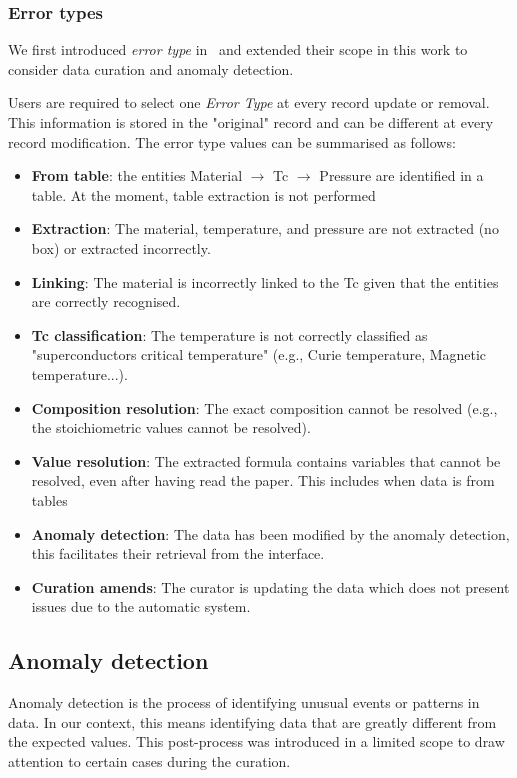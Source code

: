 \documentclass[]{interact}
\theoremstyle{plain} %
\theoremstyle{definition}
\theoremstyle{remark}
\begin{document}
\subsubsection{Error types}
\label{subsec:error-types}
We first introduced \emph{error type} in~\cite{lfoppiano2023automatic} and extended their scope in this work to consider data curation and anomaly detection. 

Users are required to select one \emph{Error Type} at every record update or removal. This information is stored in the "original" record and can be different at every record modification.
The error type values can be summarised as follows: 

\begin{itemize}
    \item \textbf{From table}: the entities Material $\rightarrow$ Tc $\rightarrow$ Pressure are identified in a table. At the moment, table extraction is not performed
    \item \textbf{Extraction}: The material, temperature, and pressure are not extracted (no box) or extracted incorrectly. 
    \item \textbf{Linking}: The material is incorrectly linked to the Tc given that the entities are correctly recognised.
    \item \textbf{Tc classification}: The temperature is not correctly classified as "superconductors critical temperature" (e.g., Curie temperature, Magnetic temperature...).
    \item \textbf{Composition resolution}: The exact composition cannot be resolved (e.g., the stoichiometric values cannot be resolved).
    \item \textbf{Value resolution}: The extracted formula contains variables that cannot be resolved, even after having read the paper. This includes when data is from tables
    \item \textbf{Anomaly detection}: The data has been modified by the anomaly detection, this facilitates their retrieval from the interface.
    \item \textbf{Curation amends}: The curator is updating the data which does not present issues due to the automatic system.
\end{itemize}

\subsection{Anomaly detection}
\label{subsec:anomaly-detection}
Anomaly detection is the process of identifying unusual events or patterns in data. 
In our context, this means identifying data that are greatly different from the expected values.
This post-process was introduced in a limited scope to draw attention to certain cases during the curation.
\end{document}
